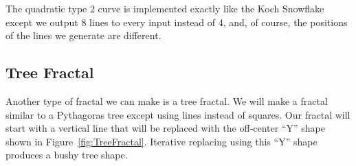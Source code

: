 The quadratic type 2 curve is implemented exactly like the Koch Snowflake except we output 8 lines to every input instead of 4, and, of course, the positions of the lines we generate are different.


\subsection{Tree Fractal}

Another type of fractal we can make is a tree fractal.
We will make a fractal similar to a Pythagoras tree except using lines instead of squares.
Our fractal will start with a vertical line that will be replaced with the off-center ``Y'' shape shown in Figure~\ref{fig:TreeFractal}.
Iterative replacing using this ``Y'' shape produces a bushy tree shape.

